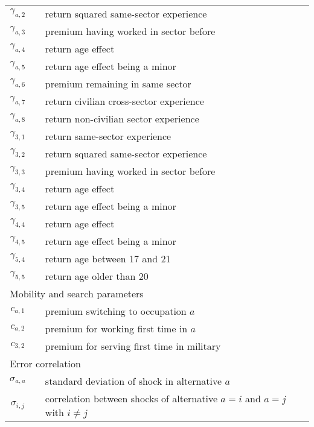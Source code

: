 \begin{ThreePartTable}
\begin{longtable}{@{}cll@{}}
$\gamma_{a,2}$       &  & return squared same-sector experience         								\\
$\gamma_{a,3}$       &  & premium having worked in sector before        							   \\
$\gamma_{a,4}$       &  & return age effect                             											     \\
$\gamma_{a,5}$       &  & return age effect being a minor               										\\
$\gamma_{a,6}$       &  & premium remaining in same sector              								   \\
$\gamma_{a,7}$       &  & return civilian cross-sector experience       								    \\
$\gamma_{a,8}$       &  & return non-civilian sector experience       										 \\
$\gamma_{3,1}$       &  & return same-sector experience                 									  \\
$\gamma_{3,2}$       &  & return squared same-sector experience    										 \\
$\gamma_{3,3}$       &  & premium having worked in sector before   										\\
$\gamma_{3,4}$       &  & return age effect                             												 \\
$\gamma_{3,5}$       &  & return age effect being a minor              	   										\\
$\gamma_{4,4}$       &  & return age effect                             												 \\
$\gamma_{4,5}$       &  & return age effect being a minor                  										\\
$\gamma_{5,4}$       &  & return age between 17 and 21                 	  									   \\
$\gamma_{5,5}$       &  & return age older than 20							   										\\[7.5pt] \midrule
\multicolumn{3}{l}{Mobility and search parameters}          													  \\ \midrule 
$c_{a,1}$            &  & premium switching to occupation $a$           									   \\
$c_{a,2}$            &  & premium for working first time in $a$         										  \\
$c_{3,2}$            &  & premium for serving first time in military    										  \\[7.5pt] \midrule
\multicolumn{3}{l}{Error correlation}          													  									\\ \midrule 
$\sigma_{a,a}$	&	& standard deviation of shock in alternative $a$									\\
$\sigma_{i,j}$ &	& correlation between shocks of alternative $a = i$ and $a=j$ with $i \neq j$ \\

\end{longtable}
\end{ThreePartTable}
